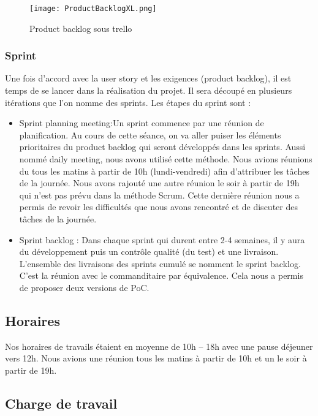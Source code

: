 \begin{figure}[h!]
  \centering
  \texttt{[image: ProductBacklogXL.png]}
	\caption[]{Product backlog sous trello}
	\label{}
\end{figure}



\subsubsection{Sprint}
Une fois d’accord avec la user story et les exigences (product backlog), il est temps de se lancer dans la réalisation du projet. Il sera découpé en plusieurs itérations que l’on nomme des sprints. 
Les étapes du sprint sont :

\begin{itemize}
    \item Sprint planning meeting:Un sprint commence par une réunion de planification. Au cours de cette séance, on va aller puiser les éléments prioritaires du product backlog qui seront développés dans les sprints.  Aussi nommé daily meeting, nous avons utilisé cette méthode. Nous avions réunions du tous les matins à partir de 10h (lundi-vendredi) afin d’attribuer les tâches de la journée. Nous avons rajouté une autre réunion le soir à partir de 19h qui n’est pas prévu dans la méthode Scrum. Cette dernière réunion nous a permis de revoir les difficultés que nous avons rencontré et de discuter des tâches de la journée. 
    \item Sprint backlog : Dans chaque sprint qui durent entre 2-4 semaines, il y aura du développement puis un contrôle qualité (du test) et une livraison. L’ensemble des livraisons des sprints cumulé se nomment le sprint backlog. C’est la réunion avec le commanditaire par équivalence. Cela nous a permis de proposer deux versions de PoC.   
\end{itemize}

\subsection{Horaires}
Nos horaires de travails étaient en moyenne de 10h – 18h avec une pause déjeuner vers 12h.
Nous avions une réunion tous les matins à partir de 10h et un le soir à partir de 19h.



\subsection{Charge de travail}

